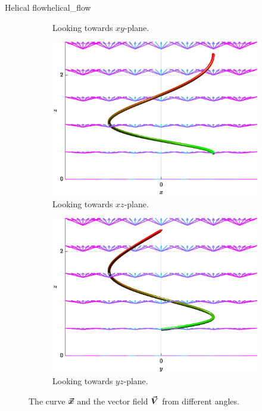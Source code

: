 \begin{ex}{Helical flow}{helical_flow}
\begin{figure}[H]
\begin{subfigure}[b]{0.3\textwidth}
         \caption{Looking towards $xy$-plane.}
         \label{fig:flow_xy}
     \end{subfigure}
     \hfill
     \begin{subfigure}[b]{0.3\textwidth}
         \centering
         \includegraphics[width=\textwidth]{Figures_Part_6/flow_xz}
         \caption{Looking towards $xz$-plane.}
         \label{fig:flow_xz}
     \end{subfigure}
     \hfill
     \begin{subfigure}[b]{0.3\textwidth}
         \centering
         \includegraphics[width=\textwidth]{Figures_Part_6/flow_yz}
         \caption{Looking towards $yz$-plane.}
         \label{fig:flow_yz}
     \end{subfigure}
        \caption{The curve $\boldsymbol{\vec{x}}$ and the vector field $\boldsymbol{\vec{V}}$ from different angles.}
        \label{fig:flow}
\end{figure}
        \end{ex}

